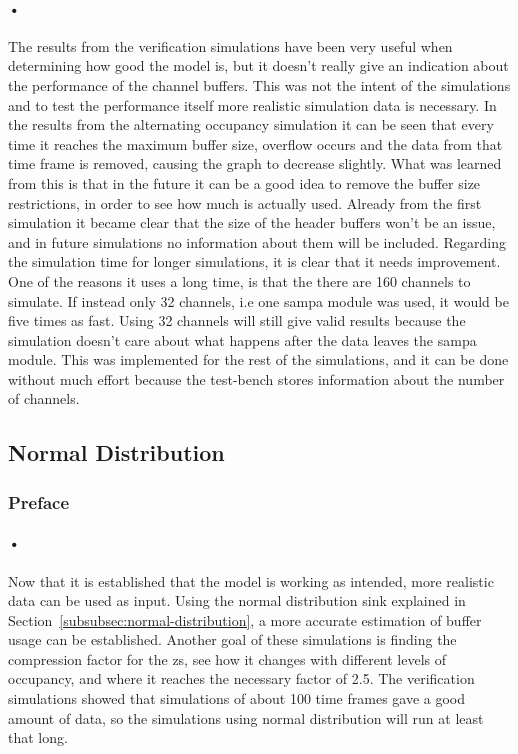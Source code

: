 \documentclass[a4paper, 12pt, openright, twoside]{report}
\begin{document}
\paragraph{•}
The results from the verification simulations have been very useful when determining how good the model is, but it doesn't really give an indication about the performance of the channel buffers.
This was not the intent of the simulations and to test the performance itself more realistic simulation data is necessary.
In the results from the alternating occupancy simulation it can be seen that every time it reaches the maximum buffer size, overflow occurs and the data from that time frame is removed, causing the graph to decrease slightly.
What was learned from this is that in the future it can be a good idea to remove the buffer size restrictions, in order to see how much is actually used.
Already from the first simulation it became clear that the size of the header buffers won't be an issue, and in future simulations no information about them will be included. 
Regarding the simulation time for longer simulations, it is clear that it needs improvement.
One of the reasons it uses a long time, is that the there are 160 channels to simulate.
If instead only 32 channels, i.e one \gls{sampa} module was used, it would be five times as fast.
Using 32 channels will still give valid results because the simulation doesn't care about what happens after the data leaves the \gls{sampa} module.
This was implemented for the rest of the simulations, and it can be done without much effort because the test-bench stores information about the number of channels.

\subsection{Normal Distribution}

\subsubsection{Preface}

\paragraph{•}
Now that it is established that the model is working as intended, more realistic data can be used as input.
Using the normal distribution sink explained in Section~\ref{subsubsec:normal-distribution}, a more accurate estimation of buffer usage can be established.
Another goal of these simulations is finding the compression factor for the \gls{zs}, see how it changes with different levels of occupancy, and where it reaches the necessary factor of 2.5.
The verification simulations showed that simulations of about 100 time frames gave a good amount of data, so the simulations using normal distribution will run at least that long.
\end{document}
